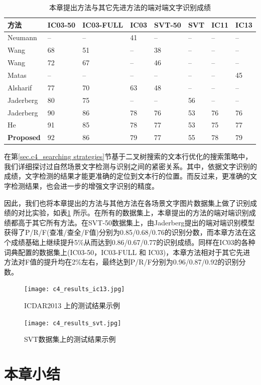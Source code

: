         \begin{table}[!h]
        \centering
        \caption{本章提出方法与其它先进方法的端对端文字识别成绩}
        \begin{tabular}{l|l l l l l l l}
        \hline
        方法 & IC03-50 & IC03-FULL & IC03 & SVT-50 & SVT & IC11 & IC13  \\
        \hline
        Neumann\cite{Neumann2010A} & -- & -- & 41 & -- & -- & -- & -- \\
        Wang\cite{Wang2012End} & 68 & 51 & -- & 38 & -- & -- & -- \\
        Wang\cite{Wang2012End} & 72 & 67 & -- & 46 & -- & -- & -- \\
        Matas\cite{Matas2014Scene} & -- & -- & -- & -- & -- & -- & 45 \\
        Alsharif\cite{Alsharif2013End} & 77 & 70 & 63 & 48 & -- & -- & -- \\
        Jaderberg\cite{Jaderberg2014Deep} & 80 & 75 & -- & -- & 56 & -- & -- \\
        Jaderberg\cite{Jaderberg2016Reading} & 90 & 86 & 78 & 76 & 53 & 76 & 76 \\
        He\cite{He2017scene} & 91 & 85 & 78 & 77 & 53 & 75 & 77 \\
        \textbf{Proposed} & 92 & 86 & 79 & 77 & 55 & 78 & 79 \\
        \hline
        \end{tabular}
        \label{tab.c4_recognition}
        \end{table}

        在第\ref{sec.c4_searching strategies}节基于二叉树搜索的文本行优化的搜索策略中，我们详细探讨过自然场景文字检测与识别之间的紧密关系。其中，依据文字识别的成绩，文字检测的结果才能更准确的定位到文本行的位置。而反过来，更准确的文字检测结果，也会进一步的增强文字识别的精度。

        因此，我们也将本章提出的方法与其他方法在各场景文字图片数据集上做了识别成绩的对比实验，如表\ref{tab.c4_recognition} 所示。在所有的数据集上，本章提出的方法的端对端识别成绩都高于其它所有方法。在SVT-50数据集上，由Jaderberg\cite{Jaderberg2016Reading}提出的端对端识别模型获得了P/R/F(查准/查全/F值)分别为0.85/0.68/0.76的识别分数，而本章方法在这个成绩基础上继续提升5\%从而达到0.86/0.67/0.77的识别成绩。同样在IC03的各种词典配置的数据集上(IC03-50，IC03-FULL 和 IC03)，本章方法相对于其它先进方法对F值的提升均在2\%左右，最终达到P/R/F分别为0.96/0.87/0.92的识别分数。
        
        \begin{figure}[!h]
        \centering
        \texttt{[image: c4\_results\_ic13.jpg]}
        \label{fig.c4_results_ic13}
        \caption{ICDAR2013 上的测试结果示例}
        \end{figure}

        \begin{figure}[!h]
        \centering
        \texttt{[image: c4\_results\_svt.jpg]}
        \label{fig.c4_results_svt}
        \caption{SVT数据集上的测试结果示例}
        \end{figure}


    \section{本章小结}


